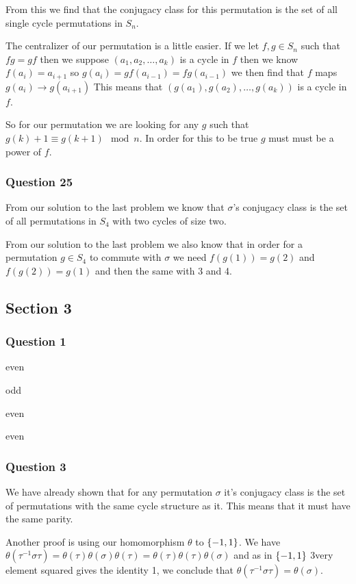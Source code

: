 \documentclass{article}
\begin{document}
From this we find that the conjugacy class for this permutation is the set of all single cycle permutations in $S_n$.


The centralizer of our permutation is a little easier. If we let $f,g\in S_n$ such that $fg = gf$ then we suppose $(a_1,a_2,\ldots,a_k)$ is a cycle in $f$ then we know $f(a_i) = a_{i+1}$ so $g(a_i) = gf(a_{i-1}) = fg(a_{i-1})$ we then find that $f$ maps $g(a_{i}) \to g(a_{i+1})$ This means that $(g(a_1),g(a_2),\ldots,g(a_k))$ is a cycle in $f$.

So for our permutation we are looking for any $g$ such that $g(k) + 1 \equiv g(k+1) \mod n$. In order for this to be true $g$ must must be a power of $f$.


\subsubsection{Question 25}
From our solution to the last problem we know that $\sigma$'s conjugacy class is the set of all permutations in $S_4$ with two cycles of size two.

From our solution to the last problem we also know that in order for a permutation $g\in S_4$ to commute with $\sigma$ we need $f(g(1)) = g(2)$ and $f(g(2)) = g(1)$ and then the same with 3 and 4.

\subsection{Section 3}
\subsubsection{Question 1}
 even

 odd

 even

 even

\subsubsection{Question 3}

We have already shown that for any permutation $\sigma$ it's conjugacy class is the set of permutations with the same cycle structure as it. This means that it must have the same parity.

Another proof is using our homomorphism $\theta$ to $\left\{ {-1, 1} \right\}$. We have $\theta(\tau^{-1}\sigma\tau) = \theta(\tau)\theta(\sigma)\theta(\tau) = \theta(\tau)\theta(\tau)\theta(\sigma)$ and as in $\left\{ {-1,1} \right\}$ 3very element squared gives the identity 1, we conclude that $\theta(\tau^{-1}\sigma\tau) = \theta(\sigma)$.
\end{document}
